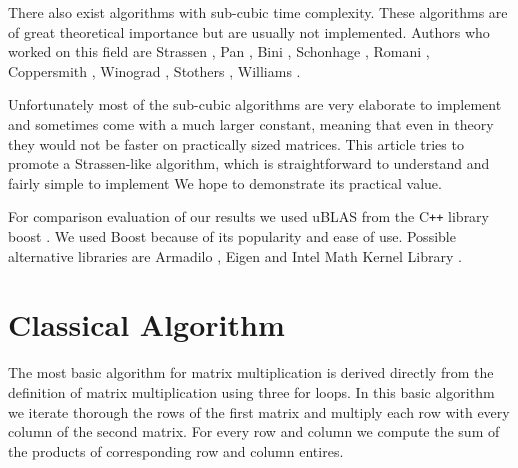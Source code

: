 \documentclass[a4paper,11pt]{article}
\newcommand{\cpp}{C\texttt{++} }
\begin{document}
There also exist algorithms with sub-cubic time complexity. These algorithms are of great theoretical importance but are usually not implemented.
Authors who worked on this field are Strassen \cite{Strassen1969}, Pan \cite{Pan1978a}, Bini \cite{Bini1979}, Schonhage \cite{Schoenhage1971}, Romani \cite{Romani1982}, Coppersmith \cite{Coppersmith1982}, Winograd \cite{Coppersmith1982}, Stothers \cite{Davie2013}, Williams \cite{Williams}.

Unfortunately most of the sub-cubic algorithms are very elaborate to implement and sometimes come with a much larger constant, meaning that even in theory they would not be faster on practically sized matrices.
This article tries to promote a Strassen-like algorithm, which is
straightforward to understand and fairly simple to implement
We hope to demonstrate its practical value.


For comparison evaluation of our results we used uBLAS from the \cpp library boost \cite{boost}. We used Boost because of its popularity and ease of use.
Possible alternative libraries are Armadilo \cite{armadillo}, Eigen \cite{eigen} and Intel Math Kernel Library \cite{mkl}.

\section{Classical Algorithm}
The most basic algorithm for matrix multiplication is derived directly from the definition of matrix multiplication using three for loops.
In this basic algorithm we iterate thorough the rows of the first matrix and multiply each row with every column of the second matrix. For every row and column we compute the sum of the products of corresponding row and column entires.
\end{document}
